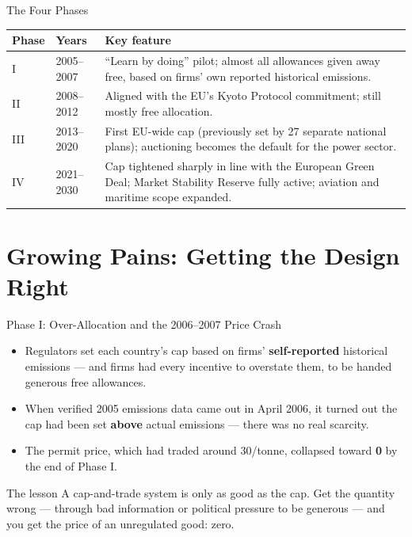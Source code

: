 \documentclass[11pt,aspectratio=169]{beamer}
\begin{document}
\begin{frame}{The Four Phases}
  \small
  \begin{center}
  \begin{tabular}{@{}p{1.6cm}p{2.0cm}p{9.0cm}@{}}
    \toprule
    \textbf{Phase} & \textbf{Years} & \textbf{Key feature} \\
    \midrule
    I & 2005--2007 & ``Learn by doing'' pilot; almost all allowances given away free, based on firms' own reported historical emissions. \\
    II & 2008--2012 & Aligned with the EU's Kyoto Protocol commitment; still mostly free allocation. \\
    III & 2013--2020 & First EU-wide cap (previously set by 27 separate national plans); auctioning becomes the default for the power sector. \\
    IV & 2021--2030 & Cap tightened sharply in line with the European Green Deal; Market Stability Reserve fully active; aviation and maritime scope expanded. \\
    \bottomrule
  \end{tabular}
  \end{center}
\end{frame}

\section{Growing Pains: Getting the Design Right}

\begin{frame}{Phase I: Over-Allocation and the 2006--2007 Price Crash}
  \begin{itemize}
    \item Regulators set each country's cap based on firms' \textbf{self-reported} historical emissions --- and firms had every incentive to overstate them, to be handed generous free allowances.
    \item When verified 2005 emissions data came out in April 2006, it turned out the cap had been set \textbf{above} actual emissions --- there was no real scarcity.
    \item The permit price, which had traded around \texteuro{}30/tonne, collapsed toward \textbf{\texteuro{}0} by the end of Phase I.
  \end{itemize}
  \begin{alertblock}{The lesson}
    A cap-and-trade system is only as good as the cap. Get the quantity wrong --- through bad information or political pressure to be generous --- and you get the price of an unregulated good: zero.
  \end{alertblock}
\end{frame}
\end{document}
